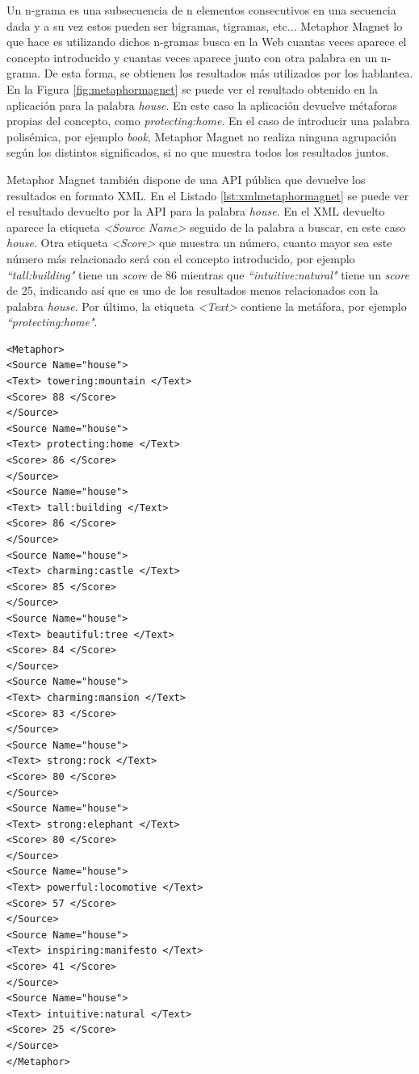 Un n-grama \citep{ngrama1999} es una subsecuencia de n elementos consecutivos en una secuencia dada y a su vez estos pueden ser bigramas, tigramas, etc... Metaphor Magnet lo que hace es utilizando dichos n-gramas busca en la Web cuantas veces aparece el concepto introducido y cuantas veces aparece junto con otra palabra en un n-grama. De esta forma, se obtienen los resultados más utilizados por los hablantea. En la Figura \ref{fig:metaphormagnet} se puede ver el resultado obtenido en la aplicación para la palabra \textit{house}. En este caso la aplicación devuelve métaforas propias del concepto, como \textit{protecting:home}.
En el caso de introducir una palabra polisémica, por ejemplo \textit{book}, Metaphor Magnet no realiza ninguna agrupación según los distintos significados, si no que muestra todos los resultados juntos.


Metaphor Magnet también dispone de una API pública que devuelve los resultados en formato XML. En el Listado \ref{lst:xmlmetaphormagnet} se puede ver el resultado devuelto por la API para la palabra \textit{house}. En el XML devuelto aparece la etiqueta \textit{<Source Name>} seguido de la palabra a buscar, en este caso \textit{house}. Otra etiqueta \textit{<Score>} que muestra un número, cuanto mayor sea este número más relacionado será con el concepto introducido, por ejemplo \textit{``tall:building"}  tiene un \textit{score} de 86 mientras que \textit{``intuitive:natural"} tiene un \textit{score} de 25, indicando así que es uno de los resultados menos relacionados con la palabra \textit{house}. Por último, la etiqueta \textit{<Text>} contiene la metáfora, por ejemplo \textit{``protecting:home"}.



\lstset{language=XML}
\begin{lstlisting}[caption= XML devuelto por Metaphor Magnet para la palabra \textit{house}, label={lst:xmlmetaphormagnet}, frame=single]
<Metaphor>
<Source Name="house">
<Text> towering:mountain </Text>
<Score> 88 </Score>
</Source>
<Source Name="house">
<Text> protecting:home </Text>
<Score> 86 </Score>
</Source>
<Source Name="house">
<Text> tall:building </Text>
<Score> 86 </Score>
</Source>
<Source Name="house">
<Text> charming:castle </Text>
<Score> 85 </Score>
</Source>
<Source Name="house">
<Text> beautiful:tree </Text>
<Score> 84 </Score>
</Source>
<Source Name="house">
<Text> charming:mansion </Text>
<Score> 83 </Score>
</Source>
<Source Name="house">
<Text> strong:rock </Text>
<Score> 80 </Score>
</Source>
<Source Name="house">
<Text> strong:elephant </Text>
<Score> 80 </Score>
</Source>
<Source Name="house">
<Text> powerful:locomotive </Text>
<Score> 57 </Score>
</Source>
<Source Name="house">
<Text> inspiring:manifesto </Text>
<Score> 41 </Score>
</Source>
<Source Name="house">
<Text> intuitive:natural </Text>
<Score> 25 </Score>
</Source>
</Metaphor>
\end{lstlisting}

